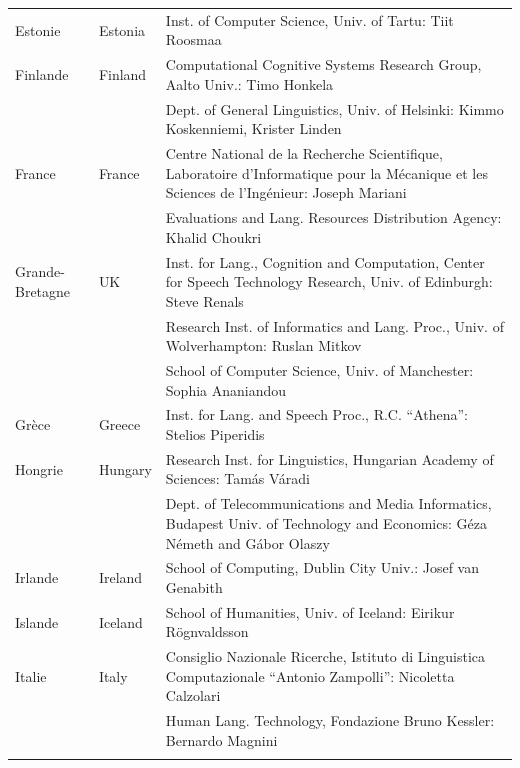 \begin{longtable}{llp{105mm}}
  Estonie & \textcolor{grey1}{Estonia} & Inst. of Computer Science, Univ. of Tartu: Tiit Roosmaa\\ \addlinespace

  Finlande & \textcolor{grey1}{Finland} & Computational Cognitive Systems Research Group, Aalto Univ.: Timo Honkela\\ \addlinespace
  & & Dept. of General Linguistics, Univ. of Helsinki: Kimmo Koskenniemi, Krister Linden \\ \addlinespace
 
 France & \textcolor{grey1}{France} & Centre National de la Recherche Scientifique, Laboratoire d'Informatique pour la Mécanique et les Sciences de l'Ingénieur: Joseph Mariani \\ \addlinespace
  & & Evaluations and Lang. Resources Distribution Agency: Khalid Choukri\\ \addlinespace 

  Grande-Bretagne & \textcolor{grey1}{UK} & Inst. for Lang., Cognition and Computation, Center for Speech Technology Research, Univ. of Edinburgh: Steve Renals \\ \addlinespace 
  & & Research Inst. of Informatics and Lang. Proc., Univ. of Wolverhampton: Ruslan Mitkov \\ \addlinespace 
  & & School of Computer Science, Univ. of Manchester: Sophia Ananiandou \\ \addlinespace 

  Grèce & \textcolor{grey1}{Greece} & Inst. for Lang. and Speech Proc., R.C. ``Athena'': Stelios Piperidis\\ \addlinespace

  Hongrie & \textcolor{grey1}{Hungary} & Research Inst. for Linguistics, Hungarian Academy of Sciences: Tamás Váradi\\  \addlinespace
  & & Dept. of Telecommunications and Media Informatics, Budapest Univ. of Technology and Economics: Géza Németh and Gábor Olaszy\\ \addlinespace

  Irlande & \textcolor{grey1}{Ireland} & School of Computing, Dublin City Univ.: Josef van Genabith\\ \addlinespace

  Islande & \textcolor{grey1}{Iceland} & School of Humanities, Univ. of Iceland: Eirikur Rögnvaldsson\\ \addlinespace

  Italie & \textcolor{grey1}{Italy} & Consiglio Nazionale Ricerche, Istituto di Linguistica Computazionale ``Antonio Zampolli'': Nicoletta Calzolari\\ \addlinespace
  & & Human Lang. Technology, Fondazione Bruno Kessler: Bernardo Magnini\\ \addlinespace 


\end{longtable}
